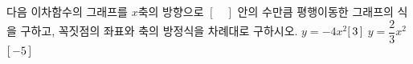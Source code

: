 다음 이차함수의 그래프를 $x$축의 방향으로 $[\quad]$ 안의 수만큼 평행이동한 그래프의 식을 구하고, 꼭짓점의 좌표와 축의 방정식을 차례대로 구하시오.
 $y=-4x^2$\quad$[\mkern3mu 3\mkern3mu ]$
 $y=\dfrac{2}{3}x^2$\quad$[\mkern3mu -5\mkern3mu ]$
